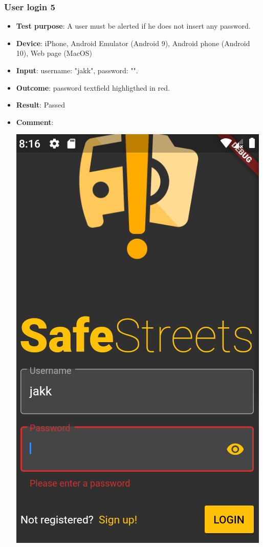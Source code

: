 \documentclass[../ATD.tex]{subfiles}
\begin{document}
    \subsubsection{User login 5}\label{subsubsec:user-login-5}
    \begin{itemize}
        \item \textbf{Test purpose}: A user must be alerted if he does not insert any password.
        \item \textbf{Device}: iPhone, Android Emulator (Android 9), Android phone (Android 10), Web page (MacOS)
        \item \textbf{Input}: username: "jakk", password: "".
        \item \textbf{Outcome}: password textfield highligthed in red.
        \item \textbf{Result}: Passed
        \item \textbf{Comment}:

        \includegraphics[scale = 0.3]{assets/noPassLogin.png}
    \end{itemize}
\end{document}
